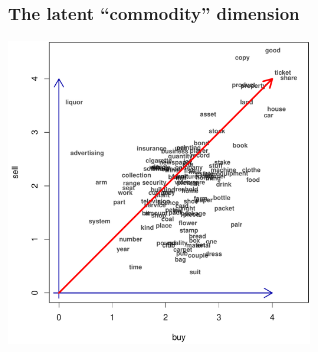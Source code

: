 \documentclass[t]{beamer} %
\begin{document}
\begin{frame}[c]
  \frametitle{The latent ``commodity'' dimension}
  \begin{center}
    \ungap[1]
    \includegraphics[width=8cm]{img/3_buy_sell_labels_latent}
  \end{center}
\end{frame}
\end{document}
